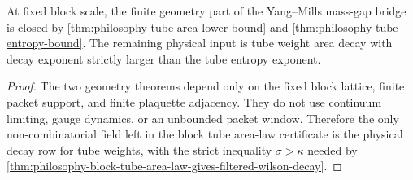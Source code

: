 \begin{corollary}
\label{cor:philosophy-finite-geometry-yang-mills-gap-bridge}
At fixed block scale, the finite geometry part of the Yang--Mills
mass-gap bridge is closed by
\autoref{thm:philosophy-tube-area-lower-bound} and
\autoref{thm:philosophy-tube-entropy-bound}. The remaining physical
input is tube weight area decay with decay exponent strictly larger
than the tube entropy exponent.
\end{corollary}
\begin{proof}
The two geometry theorems depend only on the fixed block lattice,
finite packet support, and finite plaquette adjacency. They do not use
continuum limiting, gauge dynamics, or an unbounded packet window.
Therefore the only non-combinatorial field left in the block tube
area-law certificate is the physical decay row for tube weights, with
the strict inequality $\sigma>\kappa$ needed by
\autoref{thm:philosophy-block-tube-area-law-gives-filtered-wilson-decay}.
\end{proof}
